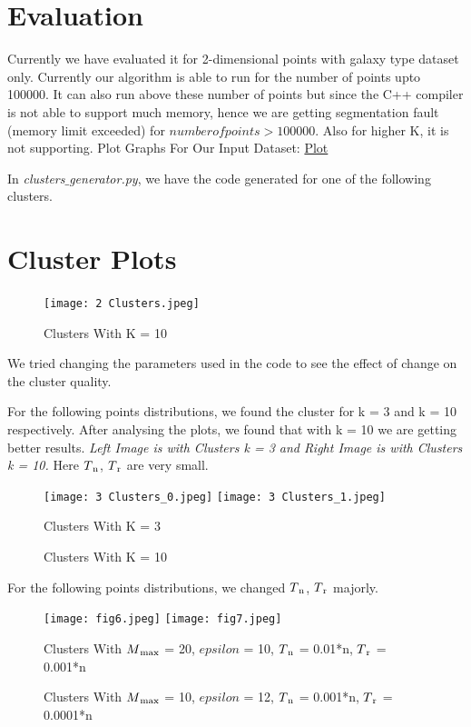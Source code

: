 \documentclass[acmsmall]{acmart}
\begin{document}
\section* {Evaluation}
Currently we have evaluated it for 2-dimensional points with galaxy type dataset only. Currently our algorithm is able to run for the number of points upto 100000. It can also run above these number of points but since the C++ compiler is not able to support much memory, hence we are getting segmentation fault (memory limit exceeded) for $number of points > 100000$. Also for higher K, it is not supporting.
Plot Graphs For Our Input Dataset: 
\textcolor{blue}{\href{https://drive.google.com/drive/folders/1vxzHzqo1U0bi-ouwb869wfAPm7_88NTk?usp=sharing}{Plot}}

In \textit{clusters$\_$generator.py}, we have the code generated for one of the following clusters.

\section* {Cluster Plots}
\begin{figure}[!h]
        \centering
        \texttt{[image: 2 Clusters.jpeg]} 
        \caption{Clusters With K = 10}
        
\end{figure}

We tried changing the parameters used in the code to see the effect of change on the cluster quality. 

For the following points distributions, we found the cluster for k = 3 and k = 10 respectively. After analysing the plots, we found that with k = 10 we are getting better results.
\textit{Left Image is with Clusters k = 3 and Right Image is with Clusters k = 10.}
Here $T\textsubscript{n}$, $T\textsubscript{r}$ are very small.
\begin{figure} [!h]
        \centering
        \texttt{[image: 3 Clusters\_0.jpeg]} 
        \texttt{[image: 3 Clusters\_1.jpeg]}
        \caption{Clusters With K = 3}
        \caption{Clusters With K = 10}
        
\end{figure}

\newpage
For the following points distributions, we changed $T\textsubscript{n}$, $T\textsubscript{r}$ majorly.

\begin{figure} [!h]
        \texttt{[image: fig6.jpeg]}
        \texttt{[image: fig7.jpeg]}
        \caption{Clusters With $M\textsubscript{max}$ = 20, $epsilon$ = 10, $T\textsubscript{n}$ = 0.01*n, $T\textsubscript{r}$ = 0.001*n} 
        \caption{Clusters With $M\textsubscript{max}$ = 10, $epsilon$ = 12, $T\textsubscript{n}$ = 0.001*n, $T\textsubscript{r}$ = 0.0001*n}
\end{figure}
\end{document}
